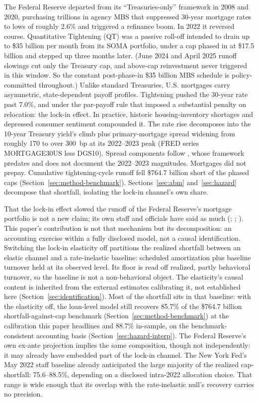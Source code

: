 \documentclass[12pt]{article}
\begin{document}
The Federal Reserve departed from its ``Treasuries-only'' framework in 2008 and 2020, purchasing trillions in agency MBS that suppressed 30-year mortgage rates to lows of roughly 2.6\% \citep{hancock2011} and triggered a refinance boom. In 2022 it reversed course. Quantitative Tightening (QT) was a passive roll-off intended to drain up to \$35 billion per month from its SOMA portfolio, under a cap phased in at \$17.5 billion and stepped up three months later. (June 2024 and April 2025 runoff slowings cut only the Treasury cap, and above-cap reinvestment never triggered in this window. So the constant post-phase-in \$35 billion MBS schedule is policy-committed throughout.) Unlike standard Treasuries, U.S. mortgages carry asymmetric, state-dependent payoff profiles. Tightening pushed the 30-year rate past 7.0\%, and under the par-payoff rule that imposed a substantial penalty on relocation: the lock-in effect. In practice, historic housing-inventory shortages and depressed consumer sentiment compounded it. The rate rise decomposes into the 10-year Treasury yield's climb plus primary-mortgage spread widening from roughly 170 to over 300~bp at its 2022--2023 peak (FRED series MORTGAGE30US less DGS10). Spread components follow \citet{boyarchenko2019}, whose framework predates and does not document the 2022--2023 magnitudes. Mortgages did not prepay. Cumulative tightening-cycle runoff fell \$764.7 billion short of the phased caps \citep[on the balance-sheet setting, see][]{lopezsalido2023,acharya2023} (Section~\ref{sec:method-benchmark}). Sections~\ref{sec:abm} and~\ref{sec:hazard} decompose that shortfall, isolating the lock-in channel's own share.

That the lock-in effect slowed the runoff of the Federal Reserve's mortgage portfolio is not a new claim; its own staff and officials have said as much (\citealp{na2024}; \citealp{perli2024}; \citealp{hammack2025}). This paper's contribution is not that mechanism but its decomposition: an accounting exercise within a fully disclosed model, not a causal identification. Switching the lock-in elasticity off partitions the realized shortfall between an elastic channel and a rate-inelastic baseline: scheduled amortization plus baseline turnover held at its observed level. Its floor is read off realized, partly behavioral turnover, so the baseline is not a non-behavioral object. The elasticity's causal content is inherited from the external estimates calibrating it, not established here (Section~\ref{sec:identification}). Most of the shortfall sits in that baseline: with the elasticity off, the loan-level model still recovers 85.7\% of the \$764.7 billion shortfall-against-cap benchmark (Section~\ref{sec:method-benchmark}) at the calibration this paper headlines and 88.7\% in-sample, on the benchmark-consistent accounting basis (Section~\ref{sec:hazard-interp}). The Federal Reserve's own ex-ante projection implies the same composition, though not independently: it may already have embedded part of the lock-in channel. The New York Fed's May 2022 staff baseline already anticipated the large majority of the realized cap-shortfall: 75.6--88.5\%, depending on a disclosed intra-2022 allocation choice. That range is wide enough that its overlap with the rate-inelastic null's recovery carries no precision.
\end{document}
